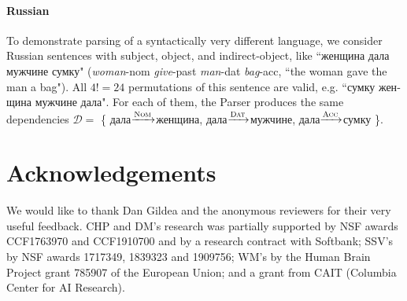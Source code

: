 \documentclass[11pt,a4paper]{article}
\begin{document}
\paragraph{Russian} To demonstrate parsing of a syntactically very different language, we consider Russian sentences with subject, object, and indirect-object, like ``\foreignlanguage{russian}{женщина дала мужчине сумку}" ({\em woman}-nom {\em give}-past {\em man}-dat {\em bag}-acc, ``the woman gave the man a bag"). All $4! = 24$ permutations of this sentence are valid, e.g. ``\foreignlanguage{russian}{сумку женщина мужчине дала}". For each of them, the Parser produces the same dependencies $\mathcal{D}=$ \{ \foreignlanguage{russian}{дала}$\xrightarrow{\textsc{Nom}}$\foreignlanguage{russian}{женщина}, \foreignlanguage{russian}{дала}$\xrightarrow{\textsc{Dat}}$\foreignlanguage{russian}{мужчине}, \foreignlanguage{russian}{дала}$\xrightarrow{\textsc{Acc}}$\foreignlanguage{russian}{сумку} \}.

\section*{Acknowledgements}
We would like to thank Dan Gildea and the anonymous reviewers for their very useful feedback. CHP and DM's research was partially supported by NSF awards CCF1763970 and CCF1910700 and by a research contract with Softbank; SSV's by NSF awards 1717349, 1839323 and 1909756; WM's by the Human Brain Project grant 785907 of the European Union; and a grant from CAIT (Columbia Center for AI Research). 



\end{document}
